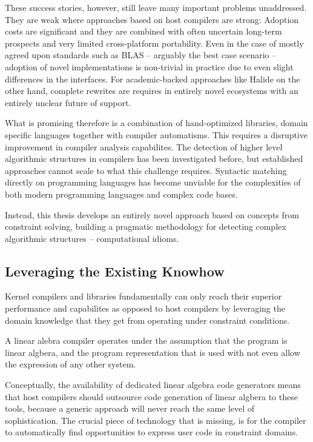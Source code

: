     These success stories, however, still leave many important problems
    unaddressed.
    They are weak where approaches based on host compilers are strong:
    Adoption costs are significant and they are combined with often uncertain
    long-term prospects and very limited cross-platform portability.
    Even in the case of mostly agreed upon standards such as BLAS --
    arguably the best case scenario -- adoption of novel implementations is
    non-trivial in practice due to even slight differences in the interfaces.
    For academic-backed approaches like Halide on the other hand, complete
    rewrites are requires in entirely novel ecosystems with an entirely unclear
    future of support.

    What is promising therefore is a combination of hand-optimized libraries,
    domain specific languages together with compiler automatisms.
    This requires a disruptive improvement in compiler analysis capabilites.
    The detection of higher level algorithmic structures in compilers has been
    investigated before, but established approaches cannot scale to what
    this challenge requires.
    Syntactic matching directly on programming languages has become
    unviable for the complexities of both modern programming languages and
    complex code bases.

    Instead, this thesis develops an entirely novel approach based on concepts
    from constraint solving, building a pragmatic methodology for detecting
    complex algorithmic structures -- computational idioms.

    \subsection*{Leveraging the Existing Knowhow}
    Kernel compilers and libraries fundamentally can only reach their superior
    performance and capabilites as opposed to host compilers by leveraging the
    domain knowledge that they get from operating under constraint conditions.
    
    A linear alebra compiler operates under the assumption that the program is
    linear algbera, and the program representation that is used with not even
    allow the expression of any other system.

    Conceptually, the availability of dedicated linear algebra code generators
    means that host compilers should outsource code generation of linear algbera
    to these tools, because a generic approach will never reach the same level
    of sophistication.
    The crucial piece of technology that is missing, is for the compiler to
    automatically find opportunities to express user code in constraint
    domains.


